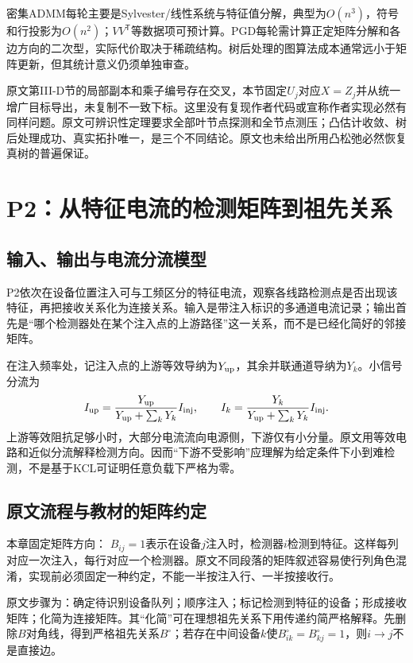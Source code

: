 \documentclass[UTF8,11pt,fontset=fandol,openany,oneside]{ctexbook}
\theoremstyle{definition}
\theoremstyle{remark}
\numberwithin{equation}{chapter}
\begin{document}
密集ADMM每轮主要是Sylvester/线性系统与特征值分解，典型为$O(n^3)$，符号和行投影为$O(n^2)$；$VV^{\mathsf T}$等数据项可预计算。PGD每轮需计算正定矩阵分解和各边方向的二次型，实际代价取决于稀疏结构。树后处理的图算法成本通常远小于矩阵更新，但其统计意义仍须单独审查。

原文第III-D节的局部副本和乘子编号存在交叉，本节固定$U_j$对应$X=Z_j$并从统一增广目标导出，未复制不一致下标。这里没有复现作者代码或宣称作者实现必然有同样问题。原文可辨识性定理要求全部叶节点探测和全节点测压；凸估计收敛、树后处理成功、真实拓扑唯一，是三个不同结论。原文也未给出所用凸松弛必然恢复真树的普遍保证。

\section{P2：从特征电流的检测矩阵到祖先关系}
\label{sec:tb-P2}

\subsection{输入、输出与电流分流模型}

P2\citep{P2}依次在设备位置注入可与工频区分的特征电流，观察各线路检测点是否出现该特征，再把接收关系化为连接关系。输入是带注入标识的多通道电流记录；输出首先是“哪个检测器处在某个注入点的上游路径”这一关系，而不是已经化简好的邻接矩阵。

在注入频率处，记注入点的上游等效导纳为$Y_{\rm up}$，其余并联通道导纳为$Y_k$。小信号分流为
\begin{equation}
 I_{\rm up}=\frac{Y_{\rm up}}{Y_{\rm up}+\sum_kY_k}I_{\rm inj},
 \qquad
 I_k=\frac{Y_k}{Y_{\rm up}+\sum_kY_k}I_{\rm inj}.
 \label{eq:tb-P2-current}
\end{equation}
上游等效阻抗足够小时，大部分电流流向电源侧，下游仅有小分量。原文用等效电路和近似分流解释检测方向。因而“下游不受影响”应理解为给定条件下小到难检测，不是基于KCL可证明任意负载下严格为零。

\subsection{原文流程与教材的矩阵约定}

本章固定矩阵方向：
$B_{ij}=1$表示在设备$j$注入时，检测器$i$检测到特征。这样每列对应一次注入，每行对应一个检测器。原文不同段落的矩阵叙述容易使行列角色混淆，实现前必须固定一种约定，不能一半按注入行、一半按接收行。

原文步骤为：确定待识别设备队列；顺序注入；标记检测到特征的设备；形成接收矩阵；化简为连接矩阵。其“化简”可在理想祖先关系下用传递约简严格解释。先删除$B$对角线，得到严格祖先关系$B^\circ$；若存在中间设备$k$使$B^\circ_{ik}=B^\circ_{kj}=1$，则$i\to j$不是直接边。
\end{document}
